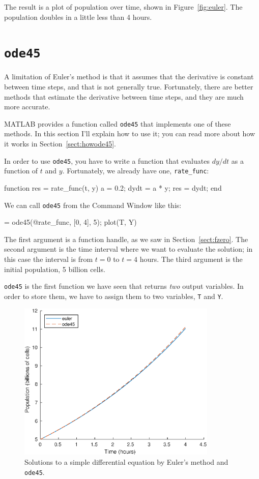 \documentclass[
]{book}
\numberwithin{Answer}{chapter}
\numberwithin{Exercise}{chapter}
\begin{document}
The result is a plot of population over time, shown in Figure~\ref{fig:euler}.  The population doubles in a little less than 4 hours.


\section{{\tt ode45}}
\label{sect:ode45}

A limitation of Euler's method is that it assumes that the derivative is constant between time steps, and that is not generally true.  Fortunately, there are better methods that estimate the derivative between time steps, and they are much more accurate. 

MATLAB provides a function called {\tt ode45} that implements one of these methods.  In this section I'll explain how to use it; you can read more about how it works in Section~\ref{sect:howode45}.

In order to use {\tt ode45}, you have to write a function that evaluates $dy/dt$ as a function of $t$ and $y$.  Fortunately, we already have one, \verb"rate_func":

\begin{code}
function res = rate_func(t, y)
   a = 0.2;
   dydt = a * y;
   res = dydt;
end
\end{code}

We can call {\tt ode45} from the {\sf Command Window} like this:

\begin{code}
[T, Y] = ode45(@rate_func, [0, 4], 5);
plot(T, Y)
\end{code}

The first argument is a function handle, as we saw in Section~\ref{sect:fzero}.  The second argument is the time interval where we want to evaluate the solution; in this case the interval is from $t=0$ to $t=4$ hours.  The third argument is the initial population, 5 billion cells.

{\tt ode45} is the first function we have seen that returns {\em two} output variables.  In order to store them, we have to assign them to two variables, {\tt T} and {\tt Y}.

\begin{figure}
\centerline{\includegraphics[height=3in]{figs/runge.eps}}
\caption{Solutions to a simple differential equation by Euler's method and {\tt ode45}.}
\label{fig:runge}
\end{figure}
\end{document}
